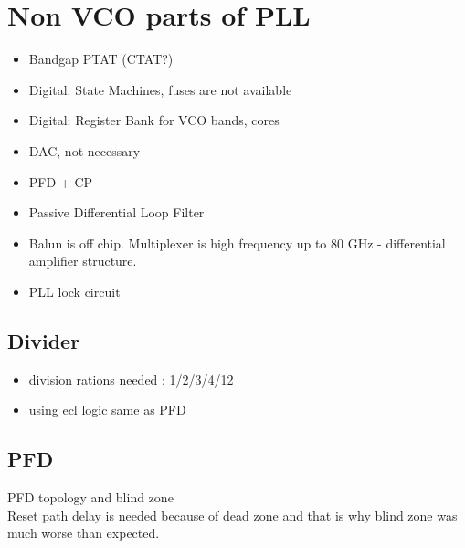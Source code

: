 \documentclass{article}
\begin{document}



\section{Non VCO parts of PLL}


\begin{itemize}
	\item Bandgap PTAT (CTAT?)  %
	\item Digital: State Machines, fuses are not available
	\item Digital: Register Bank for VCO bands, cores
	\item DAC, not necessary
	\item PFD + CP
	\item Passive Differential Loop Filter
	\item Balun is off chip. Multiplexer is high frequency up to 80 GHz - differential amplifier structure.
	\item PLL lock circuit
\end{itemize}

\subsection{Divider}


\begin{itemize}
	\item division rations needed : 1/2/3/4/12
	\item using ecl logic same as PFD
\end{itemize}


\subsection{PFD} %


PFD topology and blind zone \\

Reset path delay is needed because of dead zone and that is why blind zone was much worse than expected. %
\\
\end{document}
